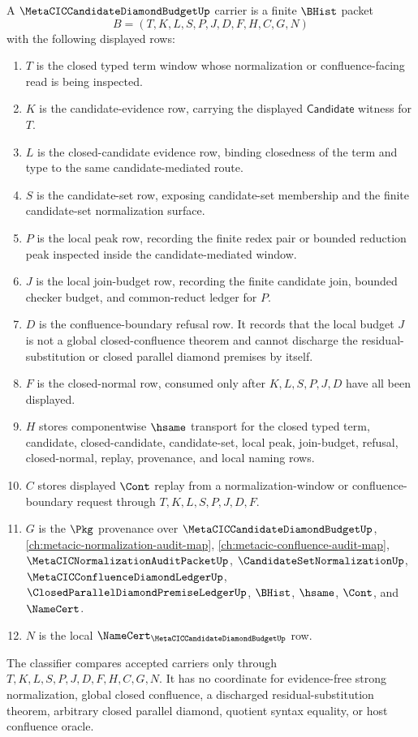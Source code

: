 \begin{definition}
\label{def:metacic-candidate-diamond-budget-carrier}
A $\MetaCICCandidateDiamondBudgetUp$ carrier is a finite $\BHist$ packet
$$
B=(T,K,L,S,P,J,D,F,H,C,G,N)
$$
with the following displayed rows:
\begin{enumerate}
\item $T$ is the closed typed term window whose normalization or confluence-facing read is being inspected.
\item $K$ is the candidate-evidence row, carrying the displayed $\mathsf{Candidate}$ witness for $T$.
\item $L$ is the closed-candidate evidence row, binding closedness of the term and type to the same candidate-mediated route.
\item $S$ is the candidate-set row, exposing candidate-set membership and the finite candidate-set normalization surface.
\item $P$ is the local peak row, recording the finite redex pair or bounded reduction peak inspected inside the candidate-mediated window.
\item $J$ is the local join-budget row, recording the finite candidate join, bounded checker budget, and common-reduct ledger for $P$.
\item $D$ is the confluence-boundary refusal row. It records that the local budget $J$ is not a global closed-confluence theorem and cannot discharge the residual-substitution or closed parallel diamond premises by itself.
\item $F$ is the closed-normal row, consumed only after $K,L,S,P,J,D$ have all been displayed.
\item $H$ stores componentwise $\hsame$ transport for the closed typed term, candidate, closed-candidate, candidate-set, local peak, join-budget, refusal, closed-normal, replay, provenance, and local naming rows.
\item $C$ stores displayed $\Cont$ replay from a normalization-window or confluence-boundary request through $T,K,L,S,P,J,D,F$.
\item $G$ is the $\Pkg$ provenance over $\MetaCICCandidateDiamondBudgetUp$, \autoref{ch:metacic-normalization-audit-map}, \autoref{ch:metacic-confluence-audit-map}, $\MetaCICNormalizationAuditPacketUp$, $\CandidateSetNormalizationUp$, $\MetaCICConfluenceDiamondLedgerUp$, $\ClosedParallelDiamondPremiseLedgerUp$, $\BHist$, $\hsame$, $\Cont$, and $\NameCert$.
\item $N$ is the local $\NameCert_{\MetaCICCandidateDiamondBudgetUp}$ row.
\end{enumerate}
The classifier compares accepted carriers only through $T,K,L,S,P,J,D,F,H,C,G,N$. It has no coordinate for evidence-free strong normalization, global closed confluence, a discharged residual-substitution theorem, arbitrary closed parallel diamond, quotient syntax equality, or host confluence oracle.
\end{definition}

